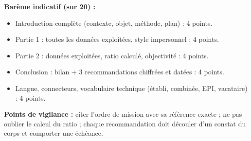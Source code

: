 \documentclass[11pt]{article}
\begin{document}
\begin{corrige}
\textbf{Barème indicatif (sur 20) :}
\begin{itemize}
    \item Introduction complète (contexte, objet, méthode, plan) : 4 points.
    \item Partie 1 : toutes les données exploitées, style impersonnel : 4 points.
    \item Partie 2 : données exploitées, ratio calculé, objectivité : 4 points.
    \item Conclusion : bilan + 3 recommandations chiffrées et datées : 4 points.
    \item Langue, connecteurs, vocabulaire technique (établi, combinée, EPI, vacataire) : 4 points.
\end{itemize}
\textbf{Points de vigilance :} citer l'ordre de mission avec sa référence exacte ; ne pas oublier le calcul du ratio ; chaque recommandation doit découler d'un constat du corps et comporter une échéance.
\end{corrige}
\end{document}
